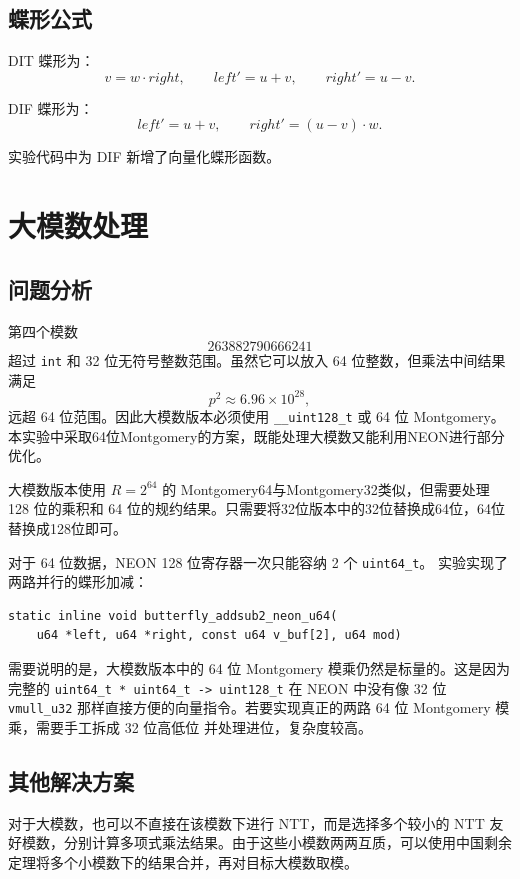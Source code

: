 \documentclass[a4paper]{article}
\begin{document}
\subsection{蝶形公式}

DIT 蝶形为：
\[
v=w\cdot right,\qquad
left'=u+v,\qquad right'=u-v.
\]

DIF 蝶形为：
\[
left'=u+v,\qquad right'=(u-v)\cdot w.
\]

实验代码中为 DIF 新增了向量化蝶形函数。

\section{大模数处理}

\subsection{问题分析}

第四个模数
\[
263882790666241
\]
超过 \texttt{int} 和 32 位无符号整数范围。虽然它可以放入 64 位整数，但乘法中间结果满足
\[
p^2\approx 6.96\times 10^{28},
\]
远超 64 位范围。因此大模数版本必须使用 \texttt{\_\_uint128\_t} 或 64 位 Montgomery。本实验中采取64位Montgomery的方案，既能处理大模数又能利用NEON进行部分优化。

大模数版本使用 $R=2^{64}$ 的 Montgomery64与Montgomery32类似，但需要处理 128 位的乘积和 64 位的规约结果。只需要将32位版本中的32位替换成64位，64位替换成128位即可。

对于 64 位数据，NEON 128 位寄存器一次只能容纳 2 个 \texttt{uint64\_t}。
实验实现了两路并行的蝶形加减：
\begin{lstlisting}
static inline void butterfly_addsub2_neon_u64(
    u64 *left, u64 *right, const u64 v_buf[2], u64 mod)
\end{lstlisting}

需要说明的是，大模数版本中的 64 位 Montgomery 模乘仍然是标量的。这是因为完整的
\texttt{uint64\_t * uint64\_t -> uint128\_t} 在 NEON 中没有像 32 位 \texttt{vmull\_u32}
那样直接方便的向量指令。若要实现真正的两路 64 位 Montgomery 模乘，需要手工拆成 32 位高低位
并处理进位，复杂度较高。

\subsection{其他解决方案}


对于大模数，也可以不直接在该模数下进行 NTT，而是选择多个较小的 NTT 友好模数，分别计算多项式乘法结果。由于这些小模数两两互质，可以使用中国剩余定理将多个小模数下的结果合并，再对目标大模数取模。
\end{document}
